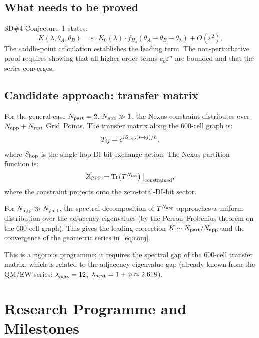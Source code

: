 \documentclass[11pt,letterpaper]{article}
\newcommand{\phig}{\varphi}
\newcommand{\eps}{\varepsilon}
\newcommand{\Napp}{N_{\rm app}}
\newcommand{\Npart}{N_{\rm part}}
\begin{document}
\subsection{What needs to be proved}

SD\#4 Conjecture~1 states:
\begin{equation}
K(\lambda,\theta_A,\theta_B)
= \eps \cdot K_0(\lambda) \cdot f_{H_4}(\theta_A-\theta_B-\theta_\lambda)
+ O(\eps^2).
\label{eq:conj}
\end{equation}
The saddle-point calculation establishes the leading term.
The non-perturbative proof requires showing that all higher-order
terms $c_n \eps^n$ are bounded and that the series converges.

\subsection{Candidate approach: transfer matrix}

For the general case $\Npart = 2$, $\Napp \gg 1$, the Nexus
constraint distributes over $\Napp + N_{\rm rest}$ Grid~Points.
The transfer matrix along the 600-cell graph is:
\begin{equation}
T_{ij} = e^{i S_{\rm hop}(i \to j) / \hbar},
\label{eq:transfer}
\end{equation}
where $S_{\rm hop}$ is the single-hop DI-bit exchange action.
The Nexus partition function is:
\begin{equation}
Z_{\rm CPP} = \text{Tr}\!\left(T^{N_{\rm tot}}\right)\big|_{\rm constrained},
\label{eq:Z_transfer}
\end{equation}
where the constraint projects onto the zero-total-DI-bit sector.

For $\Napp \gg \Npart$, the spectral decomposition of $T^{\Napp}$
approaches a uniform distribution over the adjacency eigenvalues
(by the Perron--Frobenius theorem on the 600-cell graph).  This
gives the leading correction $K \sim \Npart/\Napp$ and the
convergence of the geometric series in~\eqref{eq:conj}.

This is a rigorous programme; it requires the spectral gap of the
600-cell transfer matrix, which is related to the adjacency
eigenvalue gap (already known from the QM/EW series:
$\lambda_{\rm max} = 12$, $\lambda_{\rm next} = 1+\phig \approx
2.618$).

\section{Research Programme and Milestones}
\end{document}
